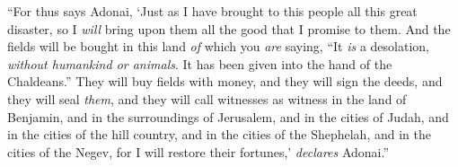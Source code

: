 \begin{biblechapter}
\verse “For thus says Adonai, ‘Just as I have brought to this people all this great disaster, so I \textit{will} bring upon them all the good that I promise to them.
\verse And the fields will be bought in this land \textit{of} which you \textit{are} saying, “It \textit{is} a desolation, \textit{without humankind or animals}. It has been given into the hand of the Chaldeans.”
\verse They will buy fields with money, and they will sign the deeds, and they will seal \textit{them}, and they will call witnesses as witness in the land of Benjamin, and in the surroundings of Jerusalem, and in the cities of Judah, and in the cities of the hill country, and in the cities of the Shephelah, and in the cities of the Negev, for I will restore their fortunes,’ \textit{declares} Adonai.”
\end{biblechapter}

